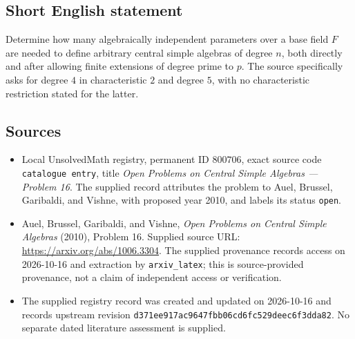 \documentclass[11pt]{article}
\begin{document}
\subsection{Short English statement}
Determine how many algebraically independent parameters over a base field \(F\) are needed to define arbitrary central simple algebras of degree \(n\), both directly and after allowing finite extensions of degree prime to \(p\). The source specifically asks for degree \(4\) in characteristic \(2\) and degree \(5\), with no characteristic restriction stated for the latter.
\subsection{Sources}
\begin{itemize}
\item Local UnsolvedMath registry, permanent ID \(800706\), exact source code \texttt{catalogue entry}, title \emph{Open Problems on Central Simple Algebras --- Problem 16}. The supplied record attributes the problem to Auel, Brussel, Garibaldi, and Vishne, with proposed year 2010, and labels its status \texttt{open}.
\item Auel, Brussel, Garibaldi, and Vishne, \emph{Open Problems on Central Simple Algebras} (2010), Problem 16. Supplied source URL: \url{https://arxiv.org/abs/1006.3304}. The supplied provenance records access on 2026-10-16 and extraction by \texttt{arxiv\_latex}; this is source-provided provenance, not a claim of independent access or verification.
\item The supplied registry record was created and updated on 2026-10-16 and records upstream revision \texttt{d371ee917ac9647fbb06cd6fc529deec6f3dda82}. No separate dated literature assessment is supplied.
\end{itemize}
\end{document}
